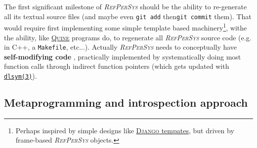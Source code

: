 \documentclass{IEEEtran}
\newcommand{\RefPerSys}{{\textit{\textsc{RefPerSys}}}}
\begin{document}
The first significant milestone of {\RefPerSys} should be the ability
to re-generate all its textual source files (and maybe even
\texttt{git add} then\texttt{git commit} them). That would require
first implementing some simple template based
machinery\footnote{Perhaps inspired by simple designs like
  \href{https://docs.djangoproject.com/en/2.2/topics/templates/}{\textsc{Django}
    tempates}, but driven by frame-based {\RefPerSys} objects.}, withe
the ability, like
\href{https://en.wikipedia.org/wiki/Quine\_(computing)}{\textsc{Quine}}
programs do, to regenerate all {\RefPerSys} source code (e.g. in C++,
a \texttt{Makefile}, etc...). Actually {\RefPerSys} needs to
conceptually have \textbf{self-modifying code}
\cite{Tschudin:2005:HarnessingSC}, practically implemented by
systematically doing most function calls through indirect function
pointers (which gets updated with
\href{http://man7.org/linux/man-pages/man3/dlsym.3.html}{\texttt{dlsym(3)}}).


\subsection{Metaprogramming and introspection approach}
\label{subsec:metaprog-introspec}
\end{document}
